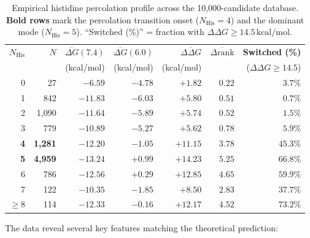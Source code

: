 \begin{table}[h!]
\centering
\small
\renewcommand{\arraystretch}{1.2}
\begin{tabular}{@{} r r r r r r r @{}}
\toprule
$N_{\text{His}}$ & $N$ & $\overline{\Delta G}(7.4)$ & $\overline{\Delta G}(6.0)$ & $\overline{\Delta\Delta G}$ & $\overline{\Delta\text{rank}}$ & \textbf{Switched (\%)} \\
& & (kcal/mol) & (kcal/mol) & (kcal/mol) & & ($\Delta\Delta G \ge 14.5$) \\
\midrule
0 & 27  & $-6.59$ & $-4.78$ & $+1.82$ & $0.22$ & $3.7\%$ \\
1 & 842 & $-11.83$ & $-6.03$ & $+5.80$ & $0.51$ & $0.7\%$ \\
2 & 1,090 & $-11.64$ & $-5.89$ & $+5.74$ & $0.52$ & $1.5\%$ \\
3 & 779 & $-10.89$ & $-5.27$ & $+5.62$ & $0.78$ & $5.9\%$ \\
\midrule
\textbf{4} & \textbf{1,281} & $-12.20$ & $-1.05$ & $\mathbf{+11.15}$ & $3.78$ & $45.3\%$ \\
\textbf{5} & \textbf{4,959} & $-13.24$ & $+0.99$ & $\mathbf{+14.23}$ & $5.25$ & $66.8\%$ \\
6 & 786 & $-12.56$ & $+0.29$ & $+12.85$ & $4.65$ & $59.9\%$ \\
7 & 122 & $-10.35$ & $-1.85$ & $+8.50$ & $2.83$ & $37.7\%$ \\
$\ge 8$ & 114 & $-12.33$ & $-0.16$ & $+12.17$ & $4.52$ & $73.2\%$ \\
\bottomrule
\end{tabular}
\caption{Empirical histidine percolation profile across the 10,000-candidate
         database.  \textbf{Bold rows} mark the percolation transition onset
         ($N_{\text{His}} = 4$) and the dominant mode ($N_{\text{His}} = 5$).
         ``Switched (\%)'' = fraction with $\Delta\Delta G \ge 14.5\,\text{kcal/mol}$.}
\label{tbl:percolation}
\end{table}

The data reveal several key features matching the theoretical prediction:

